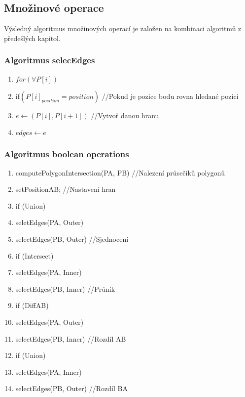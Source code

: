 \documentclass[a4paper, 12pt]{article}
\begin{document}
\subsection{Množinové operace}
Výsledný algoritmus množinových operací je založen na kombinaci algoritmů z předešlých kapitol.

\subsubsection{Algoritmus selecEdges}
\begin{enumerate}
	\item $for(\forall P[i])$
	\item \hspace{1cm} if$(P[i]_{position} = position)$ //Pokud je pozice bodu rovna hledané pozici
	\item \hspace{2cm} $e \leftarrow (P[i], P[i+1])$ //Vytvoř danou hranu
	\item $edges \leftarrow e$
\end{enumerate}

\subsubsection{Algoritmus boolean operations}

\begin{enumerate}
	\item computePolygonIntersection(PA, PB) //Nalezení průsečíků polygonů
	\item setPositionAB; //Nastavení hran
	\item if (Union)
	\item \hspace{1cm} seletEdges(PA, Outer)
	\item \hspace{1cm} selectEdges(PB, Outer) //Sjednocení
	\item if (Intersect)
	\item \hspace{1cm} seletEdges(PA, Inner)
	\item \hspace{1cm} selectEdges(PB, Inner) //Průnik
	\item if (DiffAB)
	\item \hspace{1cm} seletEdges(PA, Outer)
	\item \hspace{1cm} selectEdges(PB, Inner) //Rozdíl AB
		\item if (Union)
	\item \hspace{1cm} seletEdges(PA, Inner)
	\item \hspace{1cm} selectEdges(PB, Outer) //Rozdíl BA	
\end{enumerate}
\end{document}
